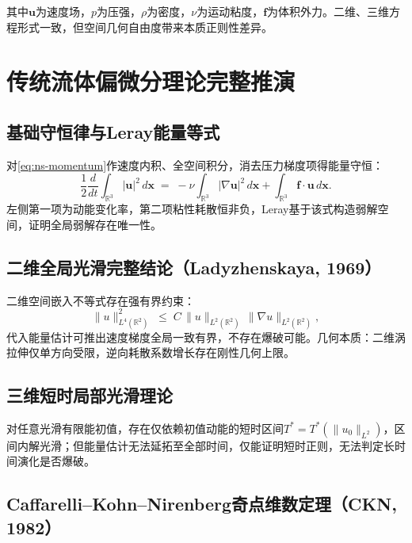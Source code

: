 \documentclass[11pt,a4paper]{ctexart}
\theoremstyle{remark}
\newcommand{\uvec}{\bm{u}}
\newcommand{\pvec}{\bm{f}}
\begin{document}
其中$\uvec$为速度场，$p$为压强，$\rho$为密度，$\nu$为运动粘度，$\pvec$为体积外力。二维、三维方程形式一致，但空间几何自由度带来本质正则性差异。

\section{传统流体偏微分理论完整推演}\label{sec:classical}

\subsection{基础守恒律与Leray能量等式}\label{sec:leray}

对\eqref{eq:ns-momentum}作速度内积、全空间积分，消去压力梯度项得能量守恒：
\begin{equation}\label{eq:leray-energy}
\frac{1}{2}\frac{d}{dt}\int_{\mathbb{R}^{3}}|\uvec|^{2}\,d\bm{x}
\;=\; -\nu\int_{\mathbb{R}^{3}}|\nabla\uvec|^{2}\,d\bm{x}
+ \int_{\mathbb{R}^{3}}\pvec\!\cdot\!\uvec\,d\bm{x}.
\end{equation}
左侧第一项为动能变化率，第二项粘性耗散恒非负，Leray基于该式构造弱解空间，证明全局弱解存在唯一性\citep{Leray1934}。

\subsection{二维全局光滑完整结论（Ladyzhenskaya, 1969）}\label{sec:2d}

二维空间嵌入不等式存在强有界约束：
\begin{equation}\label{eq:2d-embedding}
\|u\|_{L^{4}(\mathbb{R}^{2})}^{2} \;\le\; C\,\|u\|_{L^{2}(\mathbb{R}^{2})}\,\|\nabla u\|_{L^{2}(\mathbb{R}^{2})},
\end{equation}
代入能量估计可推出速度梯度全局一致有界，不存在爆破可能。几何本质：二维涡拉伸仅单方向受限，逆向耗散系数增长存在刚性几何上限。

\subsection{三维短时局部光滑理论}\label{sec:3d-short}

对任意光滑有限能初值，存在仅依赖初值动能的短时区间$T^{*}=T^{*}(\|u_{0}\|_{L^{2}})$，区间内解光滑；但能量估计无法延拓至全部时间，仅能证明短时正则，无法判定长时间演化是否爆破。

\subsection{Caffarelli--Kohn--Nirenberg奇点维数定理（CKN, 1982）}\label{sec:ckn}
\end{document}
